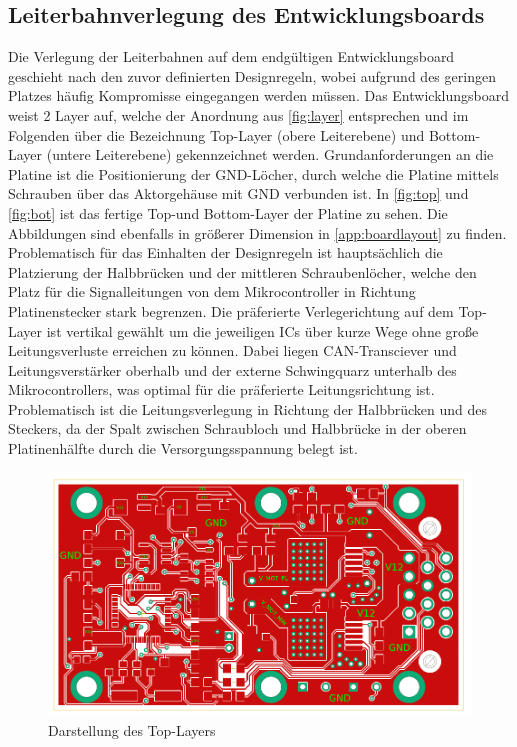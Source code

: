 \subsection{Leiterbahnverlegung des Entwicklungsboards}
Die Verlegung der Leiterbahnen auf dem endgültigen Entwicklungsboard geschieht nach den zuvor definierten Designregeln, wobei aufgrund des geringen Platzes häufig Kompromisse eingegangen werden müssen. Das Entwicklungsboard weist 2 Layer auf, welche der Anordnung aus \autoref{fig:layer} entsprechen und im Folgenden über die Bezeichnung Top-Layer (obere Leiterebene) und Bottom-Layer (untere Leiterebene) gekennzeichnet werden. Grundanforderungen an die Platine ist die Positionierung der GND-Löcher, durch welche die Platine mittels Schrauben über das Aktorgehäuse mit GND verbunden ist. In \autoref{fig:top} und \autoref{fig:bot} ist das fertige Top-und Bottom-Layer der Platine zu sehen. Die Abbildungen sind ebenfalls in größerer Dimension in \autoref{app:boardlayout} zu finden. Problematisch für das Einhalten der Designregeln ist hauptsächlich die Platzierung der Halbbrücken und der mittleren Schraubenlöcher, welche den Platz für die Signalleitungen von dem Mikrocontroller in Richtung Platinenstecker stark begrenzen. Die präferierte Verlegerichtung auf dem Top-Layer ist vertikal gewählt um die jeweiligen ICs über kurze Wege ohne große Leitungsverluste erreichen zu können. Dabei liegen CAN-Transciever und Leitungsverstärker oberhalb und der externe Schwingquarz unterhalb des Mikrocontrollers, was optimal für die präferierte Leitungsrichtung ist. Problematisch ist die Leitungsverlegung in Richtung der Halbbrücken und des Steckers, da der Spalt zwischen Schraubloch und Halbbrücke in der oberen Platinenhälfte durch die Versorgungsspannung belegt ist. 
\begin{figure}[H]%
\centering
\includegraphics[width=400pt]{./Bilder/top2}%
\caption{Darstellung des Top-Layers}%
\label{fig:top}%
\end{figure}\noindent
